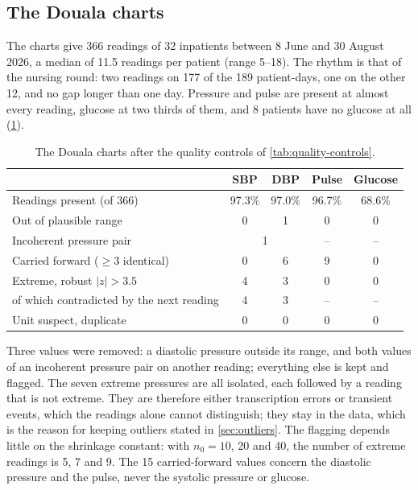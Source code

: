 \documentclass[11pt,a4paper,oneside]{report}
\begin{document}
\subsection{The Douala charts}

The charts give 366 readings of 32 inpatients between 8 June and 30 August 2026, a median of 11.5 readings per patient (range 5--18). The rhythm is that of the nursing round: two readings on 177 of the 189 patient-days, one on the other 12, and no gap longer than one day. Pressure and pulse are present at almost every reading, glucose at two thirds of them, and 8 patients have no glucose at all (\cref{tab:douala-cohort}).

\begin{table}[htbp]
\centering\footnotesize
\caption{The Douala charts after the quality controls of \cref{tab:quality-controls}.}\label{tab:douala-cohort}
\begin{tabular}{@{}lcccc@{}}
\toprule
 & \textbf{SBP} & \textbf{DBP} & \textbf{Pulse} & \textbf{Glucose} \\
\midrule
Readings present (of 366) & 97.3\% & 97.0\% & 96.7\% & 68.6\% \\
Out of plausible range & 0 & 1 & 0 & 0 \\
Incoherent pressure pair & \multicolumn{2}{c}{1} & -- & -- \\
Carried forward ($\geq 3$ identical) & 0 & 6 & 9 & 0 \\
Extreme, robust $\lvert z\rvert > 3.5$ & 4 & 3 & 0 & 0 \\
\quad of which contradicted by the next reading & 4 & 3 & -- & -- \\
Unit suspect, duplicate & 0 & 0 & 0 & 0 \\
\bottomrule
\end{tabular}
\end{table}

Three values were removed: a diastolic pressure outside its range, and both values of an incoherent pressure pair on another reading; everything else is kept and flagged. The seven extreme pressures are all isolated, each followed by a reading that is not extreme. They are therefore either transcription errors or transient events, which the readings alone cannot distinguish; they stay in the data, which is the reason for keeping outliers stated in \cref{sec:outliers}. The flagging depends little on the shrinkage constant: with $n_0 = 10$, 20 and 40, the number of extreme readings is 5, 7 and 9. The 15 carried-forward values concern the diastolic pressure and the pulse, never the systolic pressure or glucose.
\end{document}
